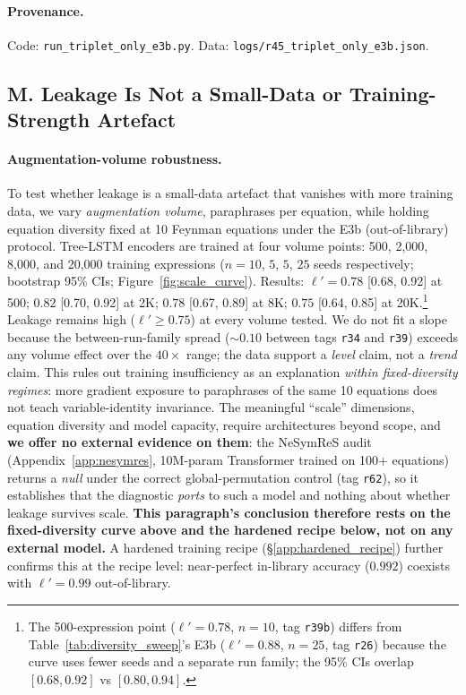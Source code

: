 \paragraph{Provenance.} Code: \texttt{run\_triplet\_only\_e3b.py}. Data: \texttt{logs/r45\_triplet\_only\_e3b.json}.

\subsection*{M. Leakage Is Not a Small-Data or Training-Strength Artefact}

\paragraph{Augmentation-volume robustness.}\label{sec:scale_curve}
To test whether leakage is a small-data artefact that vanishes with more training data, we vary \emph{augmentation volume}, paraphrases per equation, while holding equation diversity fixed at 10 Feynman equations under the E3b (out-of-library) protocol. Tree-LSTM encoders are trained at four volume points: 500, 2{,}000, 8{,}000, and 20{,}000 training expressions ($n{=}10$, $5$, $5$, $25$ seeds respectively; bootstrap 95\% CIs; Figure~\ref{fig:scale_curve}). Results: $\ell'{=}0.78$ [0.68, 0.92] at 500; $0.82$ [0.70, 0.92] at 2K; $0.78$ [0.67, 0.89] at 8K; $0.75$ [0.64, 0.85] at 20K.\footnote{The 500-expression point ($\ell'{=}0.78$, $n{=}10$, tag \texttt{r39b}) differs from Table~\ref{tab:diversity_sweep}'s E3b ($\ell'{=}0.88$, $n{=}25$, tag \texttt{r26}) because the curve uses fewer seeds and a separate run family; the 95\% CIs overlap $[0.68, 0.92]$ vs $[0.80, 0.94]$.} Leakage remains high ($\ell'{\geq}0.75$) at every volume tested. We do not fit a slope because the between-run-family spread (${\sim}0.10$ between tags \texttt{r34} and \texttt{r39}) exceeds any volume effect over the $40\times$ range; the data support a \emph{level} claim, not a \emph{trend} claim. This rules out training insufficiency as an explanation \emph{within fixed-diversity regimes}: more gradient exposure to paraphrases of the same 10 equations does not teach variable-identity invariance. The meaningful ``scale'' dimensions, equation diversity and model capacity, require architectures beyond scope, and \textbf{we offer no external evidence on them}: the NeSymReS audit (Appendix~\ref{app:nesymres}, 10M-param Transformer trained on 100+ equations) returns a \emph{null} under the correct global-permutation control (tag \texttt{r62}), so it establishes that the diagnostic \emph{ports} to such a model and nothing about whether leakage survives scale. \textbf{This paragraph's conclusion therefore rests on the fixed-diversity curve above and the hardened recipe below, not on any external model.} A hardened training recipe (\S\ref{app:hardened_recipe}) further confirms this at the recipe level: near-perfect in-library accuracy ($0.992$) coexists with $\ell'{=}0.99$ out-of-library.

